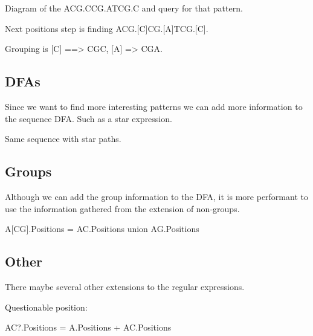 Diagram of the ACG.CCG.ATCG.C and query for that pattern.

Next positions step is finding ACG.[C]CG.[A]TCG.[C].

Grouping is [C] ==> CGC, [A] => CGA.

\subsection{DFAs}

Since we want to find more interesting patterns we can add more
information to the sequence DFA. Such as a star expression.

Same sequence with star paths.

\subsection{Groups}

Although we can add the group information to the DFA, it is more
performant to use the information gathered from the extension
of non-groups.

A[CG].Positions = AC.Positions union AG.Positions

\subsection{Other}

There maybe several other extensions to the regular expressions.

Questionable position:

AC?.Positions = A.Positions + AC.Positions